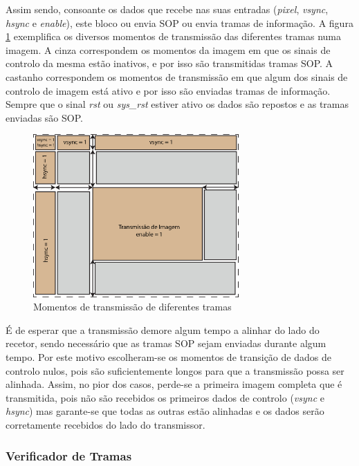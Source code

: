 \documentclass[11pt,a4paper]{article}
\begin{document}
	Assim sendo, consoante os dados que recebe nas suas entradas (\textit{pixel}, \textit{vsync}, \textit{hsync} e \textit{enable}), este bloco ou envia SOP ou envia tramas de informação. A figura \ref{fig:momentos_tramas} exemplifica os diversos momentos de transmissão das diferentes tramas numa imagem. A cinza correspondem os momentos da imagem em que os sinais de controlo da mesma estão inativos, e por isso são transmitidas tramas SOP. A castanho correspondem os momentos de transmissão em que algum dos sinais de controlo de imagem está ativo e por isso são enviadas tramas de informação. Sempre que o sinal \textit{rst} ou \textit{sys\_rst} estiver ativo os dados são repostos e as tramas enviadas são SOP. 
	
	\begin{figure}[h!]
		\begin{center}
			\leavevmode
			\includegraphics[width=0.7\textwidth]{exemplo_tramas_transmissoes}
			\caption[Momentos de transmissão de diferentes tramas]{Momentos de transmissão de diferentes tramas}
			\label{fig:momentos_tramas}
		\end{center}
	\end{figure}
	
	É de esperar que a transmissão demore algum tempo a alinhar do lado do recetor, sendo necessário que as tramas SOP sejam enviadas durante algum tempo. Por este motivo escolheram-se os momentos de transição de dados de controlo nulos, pois são suficientemente longos para que a transmissão possa ser alinhada. Assim, no pior dos casos, perde-se a primeira imagem completa que é transmitida, pois não são recebidos os primeiros dados de controlo (\textit{vsync} e \textit{hsync}) mas garante-se que todas as outras estão alinhadas e os dados serão corretamente recebidos do lado do transmissor.
	
	\subsubsection*{Verificador de Tramas} \label{subsub:serial_frameChecker}
	
\end{document}
